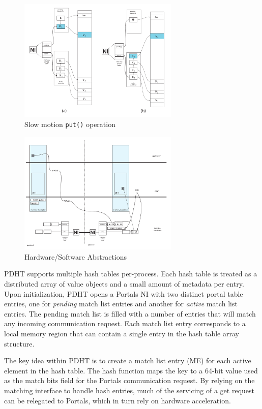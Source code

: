 \begin{figure}[ht]
  \centering
  \includegraphics[width=3in]{figs/put_smaller}
  \caption{Slow motion {\tt put()} operation}
  \label{fig:put}
\end{figure}

\begin{figure}[ht]
  \centering
  \includegraphics[width=3in]{figs/hwsw}
  \caption{Hardware/Software Abstractions}
  \label{fig:hwsw}
\end{figure}

PDHT supports multiple hash tables per-process. Each hash table is
treated as a distributed array of value objects and a small amount of
metadata per entry. Upon initialization, PDHT opens a Portals NI with
two distinct portal table entries, one for {\em pending} match list
entries and another for {\em active} match list entries. The pending
match list is filled with a number of entries that will match any
incoming communication request. Each match list entry corresponds to a
local memory region that can contain a single entry in the hash table
array structure.

The key idea within PDHT is to create a match list entry (ME) for each
active element in the hash table. The hash function maps the key to a
64-bit value used as the match bits field for the Portals
communication request. By relying on the matching interface to handle
hash entries, much of the servicing of a get request can be relegated
to Portals, which in turn rely on hardware acceleration.

